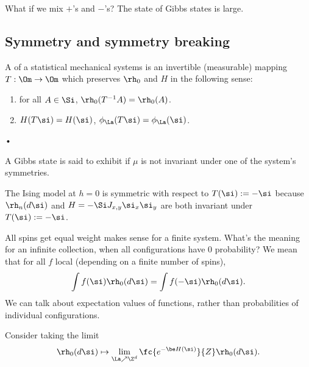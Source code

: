 What if we mix $+$'s and $-$'s? The state of Gibbs states is large. 

\subsection{Symmetry and symmetry breaking}

\begin{df}
A  of a statistical mechanical systems is an invertible (measurable) mapping $T:\Om\to \Om$ which preserves $\rh_0$ and $H$ in the following sense:
\begin{enumerate}
\item
for all $A \in \Si$, $\rh_0(T^{-1}A)=\rh_0(A)$.
\item
$H(T\si)=H(\si)$, $\phi_{\La}(T\si) = \phi_{\La}(\si)$.
\end{enumerate}•
\end{df}
\begin{df}
A Gibbs state is said to exhibit  if $\mu$ is not invariant under one of the system's symmetries. %
\end{df}
\begin{ex}
The Ising model at $h=0$ is symmetric with respect to $T(\si):=-\si$ %
because $\rh_n(d\si)$ and $H=-\Si J_{x,y} \si_x\si_y$ are both invariant under $T(\si):=-\si$. 
\end{ex}

All spins get equal weight makes sense for a finite system. What's the meaning for an infinite collection, when all configurations have 0 probability? We mean that for all $f$ local (depending on a finite number of spins), \[\int f(\si)\rh_0(d\si) = \int f(-\si) \rh_0(d\si).\] We can talk about expectation values of functions, rather than probabilities of individual configurations.

Consider taking the limit
\[
\rh_0(d\si) \mapsto \lim_{\La \nearrow \Z^d} \fc{e^{-\be H(\si)}}{Z}\rh_0(d\si).
\]
